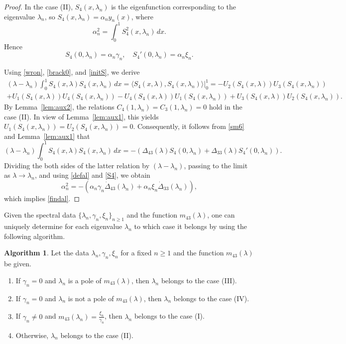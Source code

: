 \documentclass[a4paper,12pt]{article}
\newcommand{\al}{\alpha}
\newcommand{\ga}{\gamma}
\newcommand{\la}{\lambda}
\theoremstyle{plain}
\numberwithin{equation}{section}
\theoremstyle{definition}
\newtheorem{alg}[thm]{Algorithm}
\theoremstyle{remark}
\begin{document}
\begin{proof}
In the case (II), $S_4(x, \la_n)$ is the eigenfunction corresponding to the eigenvalue $\la_n$, so $S_4(x, \la_n) = \al_n y_n(x)$, where
\begin{equation} \label{defal}
\alpha_n^2 = \int_0^1 S_4^2(x, \la_n) \, dx.
\end{equation}
Hence
\begin{equation} \label{S4}
S_4(0, \la_n) = \al_n \ga_n, \quad S_4'(0, \la_n) = \al_n \xi_n. 
\end{equation}

Using \eqref{wron}, \eqref{brack0}, and \eqref{initS}, we derive
\begin{multline} \label{sm6}
(\la - \la_n) \int_0^1 S_4(x, \la) S_4(x, \la_n) \, dx = \langle S_4(x, \la), S_4(x, \la_n) \rangle \big|_0^1 = -U_2(S_4(x, \la)) U_3(S_4(x, \la_n)) \\ + U_1(S_4(x, \la)) U_4(S_4(x, \la_n)) - U_4(S_4(x, \la)) U_1(S_4(x, \la_n)) + U_3(S_4(x, \la)) U_2(S_4(x, \la_n)).
\end{multline}
By Lemma~\ref{lem:aux2}, the relations $C_4(1,\la_n) = C_3(1,\la_n) = 0$ hold in the case (II). In view of Lemma~\ref{lem:aux1}, this yields $U_1(S_4(x, \la_n)) = U_2(S_4(x, \la_n)) = 0$. Consequently, it follows from \eqref{sm6} and Lemma~\ref{lem:aux1} that
$$
(\la - \la_n) \int_0^1 S_4(x, \la) S_4(x, \la_n) \, dx = - (\Delta_{43}(\la) S_4(0, \la_n) + \Delta_{33}(\la) S_4'(0, \la_n)).
$$
Dividing the both sides of the latter relation by $(\la - \la_n)$, passing to the limit as $\la \to \la_n$, and using \eqref{defal} and \eqref{S4}, we obtain
$$
\al_n^2 = -(\al_n \ga_n \dot \Delta_{43}(\la_n) + \al_n \xi_n \dot \Delta_{33}(\la_n)),
$$
which implies \eqref{findal}.
\end{proof}

Given the spectral data $\{ \la_n, \ga_n, \xi_n \}_{n \ge 1}$ and the function $m_{43}(\la)$, one can uniquely determine for each eigenvalue $\la_n$ to which case it belongs by using the following algorithm.

\begin{alg} \label{alg:case}
Let the data $\la_n, \ga_n, \xi_n$ for a fixed $n \ge 1$ and the function $m_{43}(\la)$ be given.
\begin{enumerate}
\item If $\ga_n = 0$ and $\la_n$ is a pole of $m_{43}(\la)$, then $\la_n$ belongs to the case (III).
\item If $\ga_n = 0$ and $\la_n$ is not a pole of $m_{43}(\la)$, then $\la_n$ belongs to the case (IV).
\item If $\ga_n \ne 0$ and $m_{43}(\la_n) = \frac{\xi_n}{\ga_n}$, then $\la_n$ belongs to the case (I).
\item Otherwise, $\la_n$ belongs to the case (II).
\end{enumerate}
\end{alg}
\end{document}
